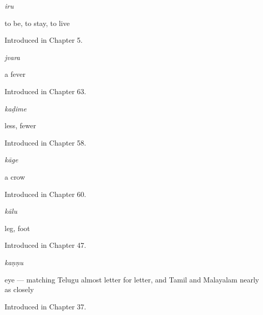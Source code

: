 \noindent\begin{minipage}[t]{\linewidth}
\raggedright
\textbf{}\enspace\emph{iru}\par
\small to be, to stay, to live\par
\footnotesize Introduced in Chapter 5.
\end{minipage}\par\medskip

\noindent\begin{minipage}[t]{\linewidth}
\raggedright
\textbf{}\enspace\emph{jvara}\par
\small a fever\par
\footnotesize Introduced in Chapter 63.
\end{minipage}\par\medskip

\noindent\begin{minipage}[t]{\linewidth}
\raggedright
\textbf{}\enspace\emph{kaḍime}\par
\small less, fewer\par
\footnotesize Introduced in Chapter 58.
\end{minipage}\par\medskip

\noindent\begin{minipage}[t]{\linewidth}
\raggedright
\textbf{}\enspace\emph{kāge}\par
\small a crow\par
\footnotesize Introduced in Chapter 60.
\end{minipage}\par\medskip

\noindent\begin{minipage}[t]{\linewidth}
\raggedright
\textbf{}\enspace\emph{kālu}\par
\small leg, foot\par
\footnotesize Introduced in Chapter 47.
\end{minipage}\par\medskip

\noindent\begin{minipage}[t]{\linewidth}
\raggedright
\textbf{}\enspace\emph{kaṇṇu}\par
\small eye — matching Telugu almost letter for letter, and Tamil and Malayalam nearly as closely\par
\footnotesize Introduced in Chapter 37.
\end{minipage}\par\medskip

